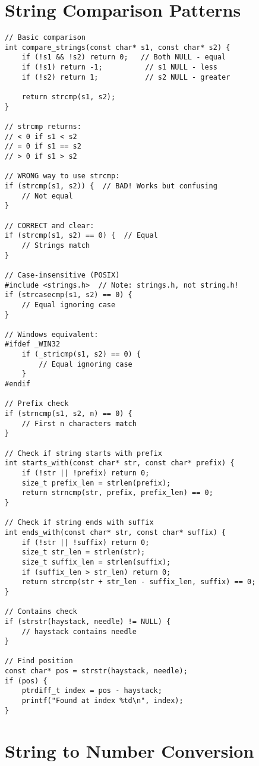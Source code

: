 \section{String Comparison Patterns}

\begin{lstlisting}
// Basic comparison
int compare_strings(const char* s1, const char* s2) {
    if (!s1 && !s2) return 0;   // Both NULL - equal
    if (!s1) return -1;          // s1 NULL - less
    if (!s2) return 1;           // s2 NULL - greater

    return strcmp(s1, s2);
}

// strcmp returns:
// < 0 if s1 < s2
// = 0 if s1 == s2
// > 0 if s1 > s2

// WRONG way to use strcmp:
if (strcmp(s1, s2)) {  // BAD! Works but confusing
    // Not equal
}

// CORRECT and clear:
if (strcmp(s1, s2) == 0) {  // Equal
    // Strings match
}

// Case-insensitive (POSIX)
#include <strings.h>  // Note: strings.h, not string.h!
if (strcasecmp(s1, s2) == 0) {
    // Equal ignoring case
}

// Windows equivalent:
#ifdef _WIN32
    if (_stricmp(s1, s2) == 0) {
        // Equal ignoring case
    }
#endif

// Prefix check
if (strncmp(s1, s2, n) == 0) {
    // First n characters match
}

// Check if string starts with prefix
int starts_with(const char* str, const char* prefix) {
    if (!str || !prefix) return 0;
    size_t prefix_len = strlen(prefix);
    return strncmp(str, prefix, prefix_len) == 0;
}

// Check if string ends with suffix
int ends_with(const char* str, const char* suffix) {
    if (!str || !suffix) return 0;
    size_t str_len = strlen(str);
    size_t suffix_len = strlen(suffix);
    if (suffix_len > str_len) return 0;
    return strcmp(str + str_len - suffix_len, suffix) == 0;
}

// Contains check
if (strstr(haystack, needle) != NULL) {
    // haystack contains needle
}

// Find position
const char* pos = strstr(haystack, needle);
if (pos) {
    ptrdiff_t index = pos - haystack;
    printf("Found at index %td\n", index);
}
\end{lstlisting}

\section{String to Number Conversion}

